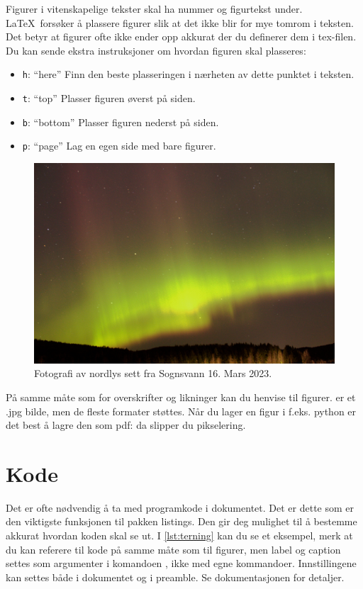 Figurer i vitenskapelige tekster skal ha nummer og figurtekst under.
\LaTeX\ forsøker å plassere figurer slik at det ikke blir for mye tomrom i teksten. Det betyr
at figurer ofte ikke ender opp akkurat der du definerer dem i tex-filen. Du kan sende ekstra
instruksjoner om hvordan figuren skal plasseres:
\begin{itemize}
	\item \texttt{h}: ``here'' Finn den beste plasseringen i nærheten av dette punktet i teksten.
	\item \texttt{t}: ``top'' Plasser figuren øverst på siden.
	\item \texttt{b}: ``bottom'' Plasser figuren nederst på siden.
	\item \texttt{p}: ``page'' Lag en egen side med bare figurer.
\end{itemize}


\begin{figure}[t] %
	\centering  %
	\includegraphics[width=\linewidth]{nordlys.jpg}  %
	\caption{Fotografi av nordlys sett fra Sognsvann 16. Mars 2023.} %
	\label{fig:nordlys} %
\end{figure}

På samme måte som for overskrifter og likninger kan du henvise til figurer. 
er et .jpg bilde, men de fleste formater støttes. Når du lager en figur i f.eks. python er det
best å lagre den som pdf: da slipper du pikselering.

\section{Kode}
Det er ofte nødvendig å ta med programkode i dokumentet. Det er dette som er den viktigste funksjonen til pakken listings. Den gir deg mulighet til å bestemme akkurat hvordan koden skal
se ut. I \cref{lst:terning} kan du se et eksempel, merk at du kan referere til kode på samme
måte som til figurer, men label og caption settes som argumenter i komandoen
\lstinline$$, ikke med egne kommandoer. 
Innstillingene kan settes både i dokumentet og i preamble. Se dokumentasjonen for detaljer.




